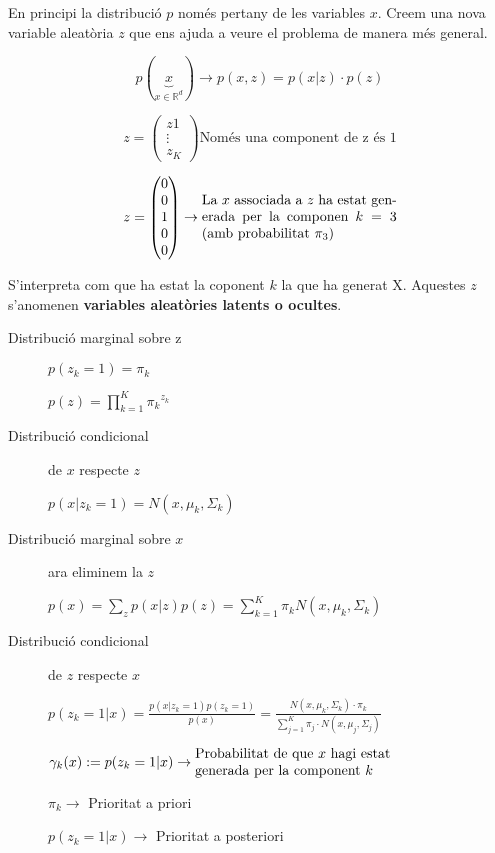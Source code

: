 \documentclass[a4paper]{article}
\begin{document}
En principi la distribució $p$ només pertany de les variables $x$. Creem una nova variable aleatòria $z$ que ens ajuda a veure el problema de manera més general.

$$
p(\underbrace{x}_{x \in \mathbb{R}^d}) \rightarrow p(x,z) = p(x|z)·p(z)
$$

$$ 
z = 
\begin{pmatrix}
z1 \\ \vdots \\ z_K
\end{pmatrix} \text{Només una component de z és 1} 
$$

$$
z = 
\begin{pmatrix}
0 \\
0 \\
1 \\
0 \\
0
\end{pmatrix}
\rightarrow
\parbox{14em}{La $x$ associada a $z$ ha estat generada per la componen $k=3$ (amb probabilitat $\pi_3$)}
$$

S'interpreta com que ha estat la coponent $k$ la que ha generat X. Aquestes $z$ s'anomenen \textbf{variables aleatòries latents o ocultes}.

\begin{description}
	\item[Distribució marginal sobre z] $p(z_k = 1) = \pi_k$
	
	$p(z) = \prod_{k=1}^K {\pi_k}^{z_k}$
	
	\item[Distribució condicional] de $x$ respecte $z$
	
	$p(x|z_k = 1) = N(x, \mu_k, \Sigma_k)$
	
	\item[Distribució marginal sobre $x$] ara eliminem la $z$
	
	$p(x) = \sum_z p(x|z)p(z) = \sum_{k=1}^K \pi_k N(x, \mu_k, \Sigma_k)$
	
	\item[Distribució condicional] de $z$ respecte $x$
	
	$p(z_k = 1|x) = \frac{p(x|z_k = 1)p(z_k = 1)}{p(x)} = 
	\frac{N(x, \mu_k, \Sigma_k)·\pi_k}{\sum_{j=1}^K \pi_j · N(x, \mu_j, \Sigma_j)}$
	
	$\gamma_k(x) := p(z_k = 1 | x) \rightarrow \parbox{14em}{Probabilitat de que $x$ hagi estat generada per la component $k$ }$
	
	$\pi_k \rightarrow$ Prioritat a priori
	
	$p(z_k = 1 | x) \rightarrow$ Prioritat a posteriori
\end{description}
\end{document}
